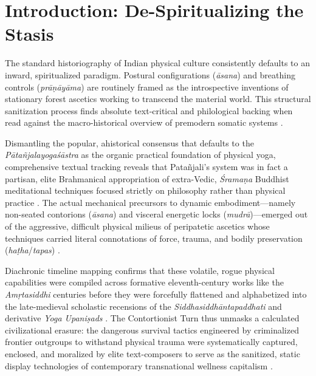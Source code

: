 \documentclass[11pt,twoside,letterpaper]{article}
\begin{document}
\clearpage


\section{Introduction: De-Spiritualizing the Stasis}
The standard historiography of Indian physical culture consistently defaults to an inward, spiritualized paradigm. Postural configurations (\textit{āsana}) and breathing controls (\textit{prāṇāyāma}) are routinely framed as the introspective inventions of stationary forest ascetics working to transcend the material world. This structural sanitization process finds absolute text-critical and philological backing when read against the macro-historical overview of premodern somatic systems \citep{Mallinson2017}. 

Dismantling the popular, ahistorical consensus that defaults to the \textit{Pātañjalayogaśāstra} as the organic practical foundation of physical yoga, comprehensive textual tracking reveals that Patañjali’s system was in fact a partisan, elite Brahmanical appropriation of extra-Vedic, \textit{Śramaṇa} Buddhist meditational techniques focused strictly on philosophy rather than physical practice \citep{Bronkhorst2007}. The actual mechanical precursors to dynamic embodiment—namely non-seated contorions (\textit{āsana}) and visceral energetic locks (\textit{mudrā})—emerged out of the aggressive, difficult physical milieus of peripatetic ascetics whose techniques carried literal connotations of force, trauma, and bodily preservation (\textit{haṭha}/\textit{tapas}) \citep{Mallinson2017}. 

Diachronic timeline mapping confirms that these volatile, rogue physical capabilities were compiled across formative eleventh-century works like the \textit{Amṛtasiddhi} centuries before they were forcefully flattened and alphabetized into the late-medieval scholastic recensions of the \textit{Siddhasiddhāntapaddhati} and derivative \textit{Yoga Upaniṣads} \citep{Bouy1994}. The Contortionist Turn thus unmasks a calculated civilizational erasure: the dangerous survival tactics engineered by criminalized frontier outgroups to withstand physical trauma were systematically captured, enclosed, and moralized by elite text-composers to serve as the sanitized, static display technologies of contemporary transnational wellness capitalism \citep{McCartney2021}.
\end{document}
